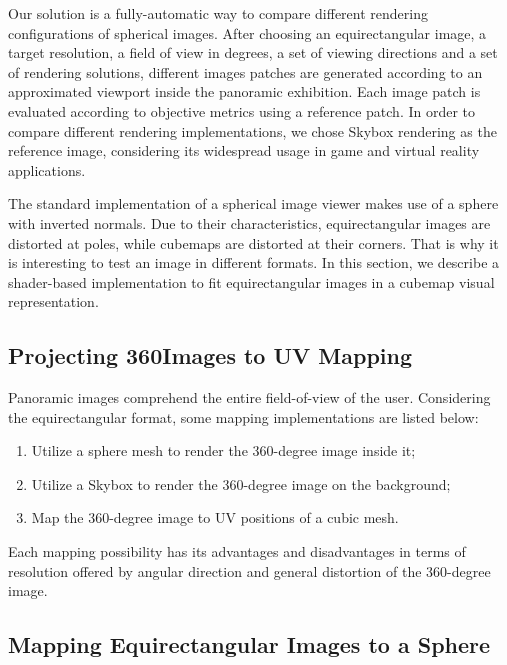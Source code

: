 \documentclass[10pt,conference,pdftex]{IEEEtran}
\begin{document}
Our solution is a fully-automatic way to compare different rendering configurations of spherical images. After choosing an equirectangular image, a target resolution, a field of view in degrees, a set of viewing directions and a set of rendering solutions, different images patches are generated according to an approximated viewport inside the panoramic exhibition. Each image patch is evaluated according to objective metrics using a reference patch. In order to compare different rendering implementations, we chose Skybox rendering as the reference image, considering its widespread usage in game and virtual reality applications.

The standard implementation of a spherical image viewer makes use of a sphere with inverted normals. Due to their characteristics, equirectangular images are distorted at poles, while cubemaps are distorted at their corners. That is why it is interesting to test an image in different formats. In this section, we describe a shader-based implementation to fit equirectangular images in a cubemap visual representation.


\subsection{Projecting 360\degree Images to UV Mapping} \label{sec:uvmapping}

Panoramic images comprehend the entire field-of-view of the user. Considering the
equirectangular format, some mapping implementations are listed below:

\begin{enumerate}
    \item Utilize a sphere mesh to render the 360-degree image inside it;
    \item Utilize a Skybox to render the 360-degree image on the background;
    \item Map the 360-degree image to UV positions of a cubic mesh.
\end{enumerate}

Each mapping possibility has its advantages and disadvantages in terms of resolution offered by angular direction and general distortion of the 360-degree image.

\subsection{Mapping Equirectangular Images to a Sphere}
\end{document}

